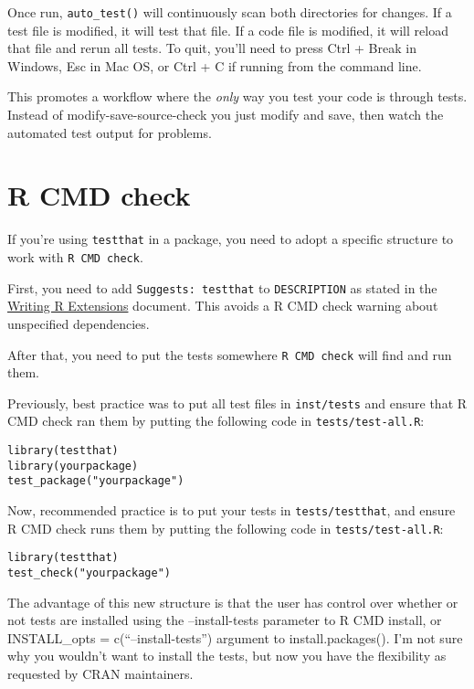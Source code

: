 Once run, \texttt{auto\_test()} will continuously scan both directories
for changes. If a test file is modified, it will test that file. If a
code file is modified, it will reload that file and rerun all tests. To
quit, you'll need to press Ctrl + Break in Windows, Esc in Mac OS, or
Ctrl + C if running from the command line.

This promotes a workflow where the \emph{only} way you test your code is
through tests. Instead of modify-save-source-check you just modify and
save, then watch the automated test output for problems.

\section{R CMD check}

If you're using \texttt{testthat} in a package, you need to adopt a
specific structure to work with \texttt{R CMD check}.

First, you need to add \texttt{Suggests: testthat} to
\texttt{DESCRIPTION} as stated in the
\href{http://cran.r-project.org/doc/manuals/R-exts.html\#Package-Dependencies}{Writing
R Extensions} document. This avoids a R CMD check warning about
unspecified dependencies.

After that, you need to put the tests somewhere \texttt{R CMD check}
will find and run them.

Previously, best practice was to put all test files in
\texttt{inst/tests} and ensure that R CMD check ran them by putting the
following code in \texttt{tests/test-all.R}:

\begin{verbatim}
library(testthat)
library(yourpackage)
test_package("yourpackage")
\end{verbatim}

Now, recommended practice is to put your tests in
\texttt{tests/testthat}, and ensure R CMD check runs them by putting the
following code in \texttt{tests/test-all.R}:

\begin{verbatim}
library(testthat)
test_check("yourpackage")
\end{verbatim}

The advantage of this new structure is that the user has control over
whether or not tests are installed using the --install-tests parameter
to R CMD install, or INSTALL\_opts = c(``--install-tests'') argument to
install.packages(). I'm not sure why you wouldn't want to install the
tests, but now you have the flexibility as requested by CRAN
maintainers.
